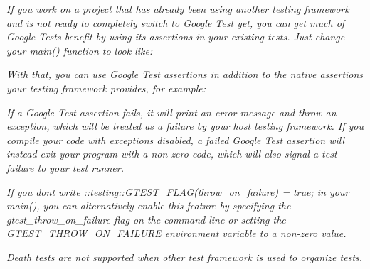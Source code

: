 {\itshape }

{\itshape If you work on a project that has already been using another testing framework and is not ready to completely switch to Google Test yet, you can get much of Google Test\textquotesingle{}s benefit by using its assertions in your existing tests. Just change your {\ttfamily main()} function to look like\+:}

{\itshape 
\begin{DoxyCode}{0}
\DoxyCodeLine{}
\DoxyCodeLine{}
\DoxyCodeLine{\}}
\end{DoxyCode}
}

{\itshape With that, you can use Google Test assertions in addition to the native assertions your testing framework provides, for example\+:}

{\itshape 
\begin{DoxyCode}{0}
\DoxyCodeLine{\}}
\end{DoxyCode}
}

{\itshape If a Google Test assertion fails, it will print an error message and throw an exception, which will be treated as a failure by your host testing framework. If you compile your code with exceptions disabled, a failed Google Test assertion will instead exit your program with a non-\/zero code, which will also signal a test failure to your test runner.}

{\itshape If you don\textquotesingle{}t write {\ttfamily \+::testing\+::\+G\+T\+E\+S\+T\+\_\+\+F\+L\+A\+G(throw\+\_\+on\+\_\+failure) = true;} in your {\ttfamily main()}, you can alternatively enable this feature by specifying the {\ttfamily -\/-\/gtest\+\_\+throw\+\_\+on\+\_\+failure} flag on the command-\/line or setting the {\ttfamily G\+T\+E\+S\+T\+\_\+\+T\+H\+R\+O\+W\+\_\+\+O\+N\+\_\+\+F\+A\+I\+L\+U\+RE} environment variable to a non-\/zero value.}

{\itshape Death tests are {\itshape not} supported when other test framework is used to organize tests.}

